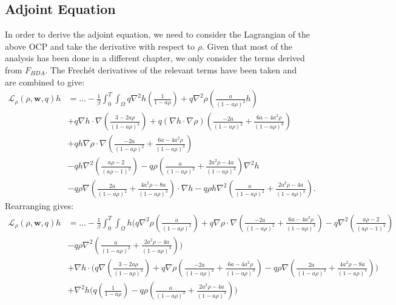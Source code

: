 \documentclass[11pt, a4paper]{article}
\theoremstyle{definition}
\newcommand{\w}{\mathbf{w}}
\begin{document}
\subsection{Adjoint Equation}
In order to derive the adjoint equation, we need to consider the Lagrangian of the above OCP and take the derivative with respect to $\rho$. Given that most of the analysis has been done in a different chapter, we only consider the terms derived from $F_{HDA}$.
The Frech\'et derivatives of the relevant terms have been taken and are combined to give:
\begin{align*}
	\mathcal{L}_\rho(\rho,\w,q)h &= ... -\frac{1}{\beta}\int_0^T \int_\Omega q \nabla^2 h \left(\frac{1}{1- a\rho} \right) + q\nabla^2 \rho \left(\frac{a}{(1- a\rho)^2}h\right)\\
	&+ q\nabla h \cdot \nabla \left( \frac{3-2a\rho}{(1-a\rho)^2} \right) + q\left(\nabla h \cdot \nabla \rho \right) \left( \frac{-2a }{(1-a\rho)^2} + \frac{6a-4a^2  \rho}{(1-a\rho)^3}  \right) \\
	&+ qh \nabla \rho \cdot \nabla \left(\frac{-2a }{(1-a\rho)^2} + \frac{6a-4a^2  \rho}{(1-a\rho)^3}  \right)\\
	&- qh \nabla^2 \left(\frac{a\rho -2}{(a\rho -1)^2}\right) - q\rho  \left(\frac{a }{(1-a\rho)^2} + \frac{2a^2\rho -4a}{(1-a\rho)^3} \right)\nabla^2 h \\
	&- q\rho \nabla \left(\frac{2a }{(1-a\rho)^2} + \frac{4a^2\rho -8a}{(1-a\rho)^3} \right) \cdot \nabla h - q\rho h \nabla^2  \left(\frac{a }{(1-a\rho)^2} + \frac{2a^2\rho -4a}{(1-a\rho)^3} \right).
\end{align*}
Rearranging gives:
\begin{align*}
	\mathcal{L}_\rho(\rho,\w,q)h &=... -\frac{1}{\beta}\int_0^T \int_\Omega h \bigg(q\nabla^2 \rho \left(\frac{a}{(1- a\rho)^2}\right)  + q \nabla \rho \cdot \nabla \left(\frac{-2a }{(1-a\rho)^2} + \frac{6a-4a^2  \rho}{(1-a\rho)^3}  \right) - q \nabla^2 \left(\frac{a\rho -2}{(a\rho -1)^2}\right)\\
	&- q\rho  \nabla^2  \left(\frac{a }{(1-a\rho)^2} + \frac{2a^2\rho -4a}{(1-a\rho)^3} \right)\bigg)\\
	&+ \nabla h \cdot \bigg( q  \nabla \left( \frac{3-2a\rho}{(1-a\rho)^2} \right) + q \nabla \rho  \left( \frac{-2a }{(1-a\rho)^2} + \frac{6a-4a^2  \rho}{(1-a\rho)^3}  \right)- q\rho \nabla \left(\frac{2a }{(1-a\rho)^2} + \frac{4a^2\rho -8a}{(1-a\rho)^3} \right) \bigg)\\
	&+ \nabla^2 h \bigg(q \left(\frac{1}{1- a\rho} \right)  - q\rho  \left(\frac{a }{(1-a\rho)^2} + \frac{2a^2\rho -4a}{(1-a\rho)^3} \right)  \bigg)
\end{align*}
\end{document}
